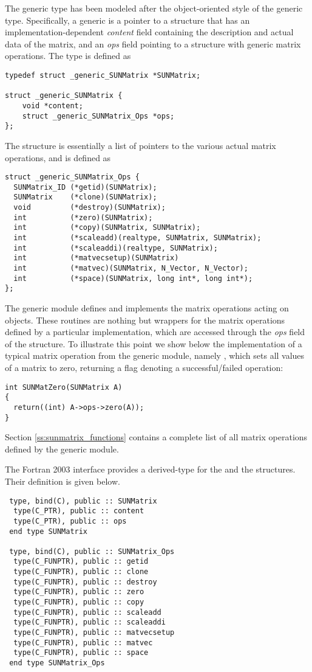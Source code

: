 The generic  type has been modeled after the
object-oriented style of the generic  type.
Specifically, a generic  is a pointer to a structure
that has an implementation-dependent {\em content} field containing
the description and actual data of the matrix, and an {\em ops} field
pointing to a structure with generic matrix operations.
The type  is defined as
\begin{verbatim}
typedef struct _generic_SUNMatrix *SUNMatrix;

struct _generic_SUNMatrix {
    void *content;
    struct _generic_SUNMatrix_Ops *ops;
};
\end{verbatim}
The  structure is essentially a list of pointers to
the various actual matrix operations, and is defined as
\begin{verbatim}
struct _generic_SUNMatrix_Ops {
  SUNMatrix_ID (*getid)(SUNMatrix);
  SUNMatrix    (*clone)(SUNMatrix);
  void         (*destroy)(SUNMatrix);
  int          (*zero)(SUNMatrix);
  int          (*copy)(SUNMatrix, SUNMatrix);
  int          (*scaleadd)(realtype, SUNMatrix, SUNMatrix);
  int          (*scaleaddi)(realtype, SUNMatrix);
  int          (*matvecsetup)(SUNMatrix)
  int          (*matvec)(SUNMatrix, N_Vector, N_Vector);
  int          (*space)(SUNMatrix, long int*, long int*);
};
\end{verbatim}


The generic {\sunmatrix} module defines and implements the matrix operations
acting on  objects.
These routines are nothing but wrappers for the matrix operations defined by
a particular {\sunmatrix} implementation, which are accessed through the {\em ops}
field of the  structure. To illustrate this point we
show below the implementation of a typical matrix operation from the
generic {\sunmatrix} module, namely , which sets all
values of a matrix  to zero, returning a flag denoting a
successful/failed operation:
\begin{verbatim}
int SUNMatZero(SUNMatrix A)
{
  return((int) A->ops->zero(A));
}
\end{verbatim}
Section \ref{ss:sunmatrix_functions} contains a complete list of all matrix operations
defined by the generic {\sunmatrix} module.

The Fortran 2003 interface provides a  derived-type for the
 and the  structures.
Their definition is given below.
\begin{verbatim}
 type, bind(C), public :: SUNMatrix
  type(C_PTR), public :: content
  type(C_PTR), public :: ops
 end type SUNMatrix

 type, bind(C), public :: SUNMatrix_Ops
  type(C_FUNPTR), public :: getid
  type(C_FUNPTR), public :: clone
  type(C_FUNPTR), public :: destroy
  type(C_FUNPTR), public :: zero
  type(C_FUNPTR), public :: copy
  type(C_FUNPTR), public :: scaleadd
  type(C_FUNPTR), public :: scaleaddi
  type(C_FUNPTR), public :: matvecsetup
  type(C_FUNPTR), public :: matvec
  type(C_FUNPTR), public :: space
 end type SUNMatrix_Ops
\end{verbatim}



